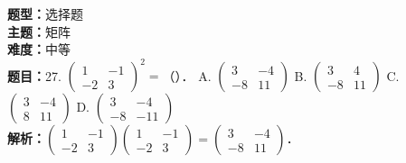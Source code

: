 \documentclass{ctexart}
\newenvironment{question}[5]{%
	\noindent\textbf{题型：}#1\\
	\textbf{主题：}#2\\
	\textbf{难度：}#3\\
	\textbf{题目：}#4\\
	\textbf{解析：}#5\\
	\vspace{1em}
}{}
\begin{document}
	\begin{question}
		{选择题}
		{矩阵}
		{中等}
		{27. \(\left(\begin{array}{cc}1 & -1 \\ -2 & 3\end{array}\right)^2=\)（）．
			A. \(\left(\begin{array}{cc}3 & -4 \\ -8 & 11\end{array}\right)\)
			B. \(\left(\begin{array}{cc}3 & 4 \\ -8 & 11\end{array}\right)\)
			C. \(\left(\begin{array}{ll}3 & -4 \\ 8 & 11\end{array}\right)\)
			D. \(\left(\begin{array}{cc}3 & -4 \\ -8 & -11\end{array}\right)\)}
		{\(\left(\begin{array}{cc}1 & -1 \\ -2 & 3\end{array}\right)\left(\begin{array}{cc}1 & -1 \\ -2 & 3\end{array}\right)=\left(\begin{array}{cc}3 & -4 \\ -8 & 11\end{array}\right)\)．}
	\end{question}
	
\end{document}
